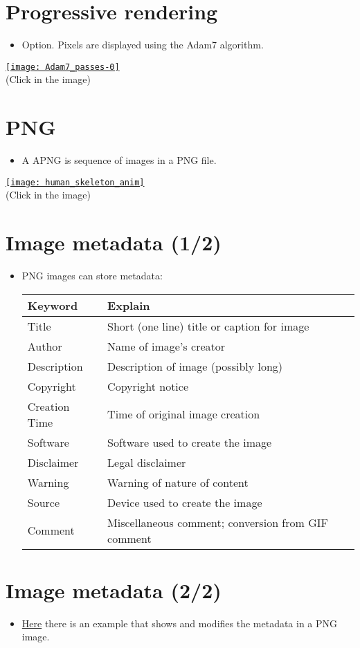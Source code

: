 \section{Progressive rendering}
\begin{itemize}
\item Option. Pixels are displayed using the Adam7 algorithm.
\end{itemize}
\begin{center}
  \href{https://upload.wikimedia.org/wikipedia/commons/2/27/Adam7_passes.gif}{\texttt{[image: Adam7\_passes-0]}} \\
  (Click in the image)
\end{center}
  
\section{ PNG}
\begin{itemize}
\item A \gls{APNG} is sequence of images in a \gls{PNG} file.
\end{itemize}
\begin{center}
  \href{https://commons.wikimedia.org/wiki/Category:Animated_PNG_files#/media/File:201805_human_skeleton_anim.png}{\texttt{[image: human\_skeleton\_anim]}} \\
  (Click in the image)
\end{center}

\section{Image metadata (1/2)}
\begin{itemize}
\item PNG images can store metadata:
  \begin{center}
    \begin{tabular}{l|l}
      Keyword & Explain\\
      \hline
      Title & Short (one line) title or caption for image \\
      Author & Name of image's creator \\
      Description & Description of image (possibly long) \\
      Copyright & Copyright notice \\
      Creation Time & Time of original image creation \\
      Software & Software used to create the image \\
      Disclaimer & Legal disclaimer \\
      Warning & Warning of nature of content \\
      Source & Device used to create the image \\
      Comment & Miscellaneous comment; conversion from GIF comment
    \end{tabular}
  \end{center}
\end{itemize}

\section*{Image metadata (2/2)}
\begin{itemize}
\item
  \href{https://github.com/vicente-gonzalez-ruiz/medical_imaging/blob/main/notebooks/PNG_add_metadata.ipynb}{Here}
  there is an example that shows and modifies the metadata in a PNG
  image.
\end{itemize}